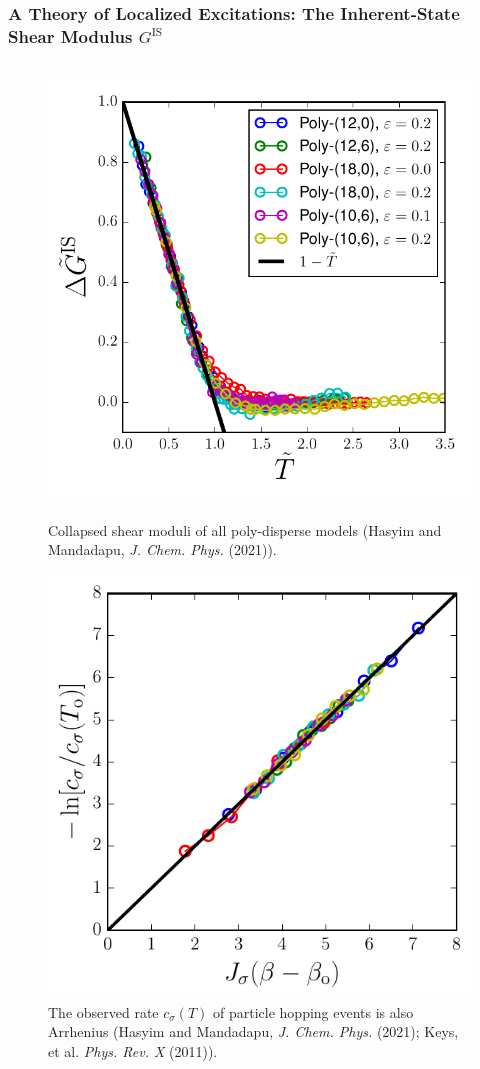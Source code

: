 \begin{frame}[c]\label{b.2}
\frametitle{A Theory of Localized Excitations: The Inherent-State Shear Modulus $G^\mathrm{IS}$}

\begin{columns}[c]
\begin{column}[T]{0.5\textwidth}

\begin{figure}
    \begin{overprint}
    \centering\includegraphics[width=0.85\linewidth]{b.2-exc_results_1/dimshearmodulus.pdf}\caption{Collapsed shear moduli of all poly-disperse models (Hasyim and Mandadapu,  \textit{J. Chem. Phys.} (2021)).}
    \centering\includegraphics[width=0.85\linewidth]{b.2-exc_results_1/csigma.pdf}\caption{The observed rate $c_\sigma(T)$ of particle hopping events is also Arrhenius (Hasyim and Mandadapu,  \textit{J. Chem. Phys.} (2021); Keys, et al. \textit{Phys. Rev. X} (2011)).}
    \end{overprint}
\end{figure}


\end{column}
\end{columns}
\end{frame}
